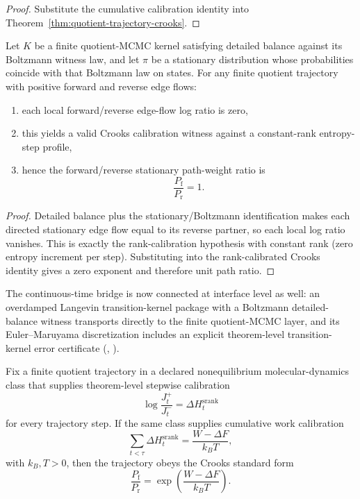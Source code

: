 \begin{proof}
Substitute the cumulative calibration identity into Theorem~\ref{thm:quotient-trajectory-crooks}.
\end{proof}

\begin{theorem}\label{thm:crooks-detailed-balance-equilibrium}
Let $K$ be a finite quotient-MCMC kernel satisfying detailed balance against its Boltzmann witness law, and let $\pi$ be a stationary distribution whose probabilities coincide with that Boltzmann law on states. For any finite quotient trajectory with positive forward and reverse edge flows:
\begin{enumerate}
\item each local forward/reverse edge-flow log ratio is zero,
\item this yields a valid Crooks calibration witness against a constant-rank entropy-step profile,
\item hence the forward/reverse stationary path-weight ratio is
\[
\frac{P_{\mathrm f}}{P_{\mathrm r}}=1.
\]
\end{enumerate}
\end{theorem}

\begin{proof}
Detailed balance plus the stationary/Boltzmann identification makes each directed stationary edge flow equal to its reverse partner, so each local log ratio vanishes. This is exactly the rank-calibration hypothesis with constant rank (zero entropy increment per step). Substituting into the rank-calibrated Crooks identity gives a zero exponent and therefore unit path ratio.
\end{proof}

The continuous-time bridge is now connected at interface level as well: an overdamped Langevin transition-kernel package with a Boltzmann detailed-balance witness transports directly to the finite quotient-MCMC layer, and its Euler--Maruyama discretization includes an explicit theorem-level transition-kernel error certificate (, ).

\begin{theorem}\label{thm:md-class-crooks-calibration-interface}
Fix a finite quotient trajectory in a declared nonequilibrium molecular-dynamics class that supplies theorem-level stepwise calibration
\[
\log\frac{J_t^+}{J_t^-} = \Delta H_t^{\mathrm{srank}}
\]
for every trajectory step. If the same class supplies cumulative work calibration
\[
\sum_{t<\tau}\Delta H_t^{\mathrm{srank}} = \frac{W-\Delta F}{k_B T},
\]
with $k_B,T>0$, then the trajectory obeys the Crooks standard form
\[
\frac{P_{\mathrm f}}{P_{\mathrm r}}=
\exp\!\left(\frac{W-\Delta F}{k_B T}\right).
\]
\end{theorem}

